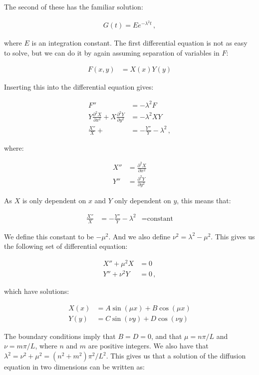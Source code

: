 \documentclass[reprint,english,notitlepage]{revtex4-1}  %
\begin{document}
The second of these has the familiar solution:

\begin{align*}
G(t) = Ee^{-\lambda^2 t} \, ,
\end{align*}

where $E$ is an integration constant. The first differential equation is not as easy to solve, but we can do it by again assuming separation of variables in $F$:

\begin{align*}
F(x,y) &= X(x) Y(y)
\end{align*}

Inserting this into the differential equation gives:

\begin{align*}
F'' &= -\lambda^2 F \\
Y \frac{\partial^2 X}{\partial x^2} + X \frac{\partial^2 Y}{\partial y^2} &= -\lambda^2 XY \\
\frac{X''}{X} +  &= - \frac{Y''}{Y} - \lambda^2 \, ,
\end{align*}

where:

\begin{align*}
X'' &= \frac{\partial^2 X}{\partial x^2} \\
Y'' &= \frac{\partial^2 Y}{\partial y^2}
\end{align*}

As $X$ is only dependent on $x$ and $Y$ only dependent on $y$, this means that:

\begin{align*}
\frac{X''}{X} &= - \frac{Y''}{Y} - \lambda^2 &= \text{constant}
\end{align*}

We define this constant to be $-\mu^2$. And we also define $\nu^2 = \lambda^2 - \mu^2$. This gives us the following set of differential equation:

\begin{align*}
X'' + \mu^2 X &= 0 \\
Y'' + \nu^2 Y &= 0 \, ,
\end{align*}  

which have solutions:

\begin{align*}
X(x) &= A \sin(\mu x) + B\cos(\mu x) \\
Y(y) &= C \sin (\nu y) + D \cos (\nu y)
\end{align*}

The boundary conditions imply that $B=D=0$, and that $\mu = n\pi/L$ and $\nu = m\pi/L$, where $n$ and $m$ are positive integers. We also have that $\lambda^2 = \nu^2 + \mu^2 = (n^2+m^2) \pi^2/L^2$. This gives us that a solution of the diffusion equation in two dimensions can be written as:
\end{document}
